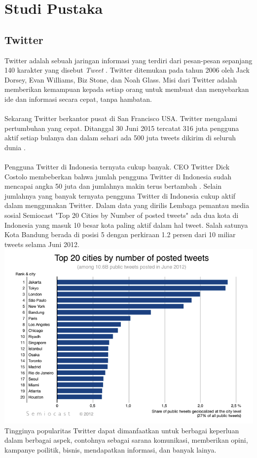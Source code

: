 \chapter{Studi Pustaka}
\section{Twitter}
Twitter adalah sebuah jaringan informasi yang terdiri dari pesan-pesan sepanjang 140 karakter yang disebut \textit{Tweet} \cite{TwitterDef:2015}. Twitter ditemukan pada tahun 2006 oleh Jack Dorsey, Evan Williams, Biz Stone, dan Noah Glass. Misi dari Twitter adalah memberikan kemampuan kepada setiap orang untuk membuat dan menyebarkan ide dan informasi secara cepat, tanpa hambatan.\\\\
Sekarang Twitter berkantor pusat di San Francisco USA. Twitter mengalami pertumbuhan yang cepat. Ditanggal 30 Juni 2015 tercatat 316 juta pengguna aktif setiap bulanya dan dalam sehari ada 500 juta tweets dikirim di seluruh dunia \cite{TwitterComp:2015}.\\\\
Pengguna Twitter di Indonesia ternyata cukup banyak. CEO Twitter Dick Costolo membeberkan bahwa jumlah pengguna Twitter di Indonesia sudah mencapai angka 50 juta dan jumlahnya makin terus bertambah \cite{TwitterUser:2015}. Selain jumlahnya yang banyak ternyata pengguna Twitter di Indonesia cukup aktif dalam menggunakan Twitter. Dalam data yang dirilis Lembaga pemantau media sosial Semiocast "Top 20 Cities by Number of posted tweets" ada dua kota di Indonesia yang masuk 10 besar kota paling aktif dalam hal tweet. Salah satunya Kota Bandung berada di posisi 5 dengan perkiraan 1.2 persen dari 10 miliar tweets selama Juni 2012.\\
\includegraphics[width=\linewidth]{Gambar/mine/twittercity}
Tingginya popularitas Twitter dapat dimanfaatkan untuk berbagai keperluan dalam berbagai aspek, contohnya sebagai sarana komunikasi, memberikan opini, kampanye poilitik, bisnis, mendapatkan informasi, dan banyak lainya.
